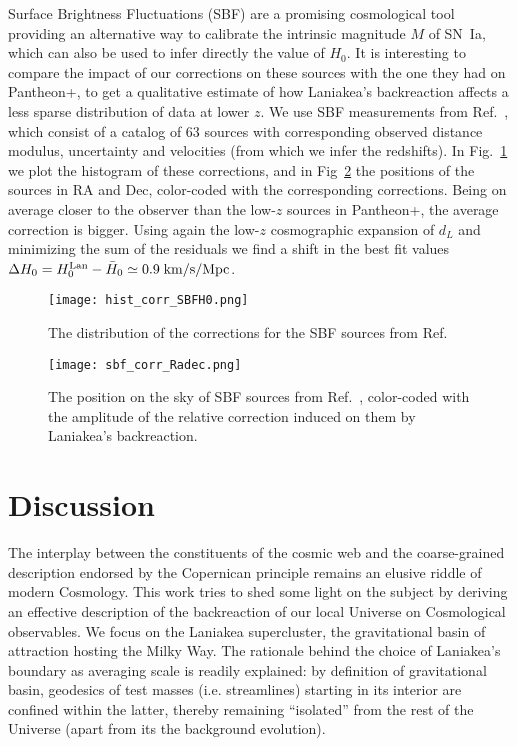 \documentclass[notitlepage,nofootinbib]{revtex4-1}
\begin{document}
Surface Brightness Fluctuations (SBF) are a promising cosmological tool providing an alternative way to calibrate the intrinsic magnitude $M$ of SN~Ia, which can also be used to infer directly the value of $H_0$. It is interesting to compare the impact of our corrections on these sources with the one they had on Pantheon+, to get a qualitative estimate of how Laniakea's backreaction affects a less sparse distribution of data at lower $z$. 
We use SBF measurements from Ref.~\cite{2021ApJS..255...21J}, which consist of a catalog of 63 sources with corresponding observed distance modulus, uncertainty and velocities (from which we infer the redshifts). In Fig.~\ref{SBFcorr-radec-hist} we plot the histogram of these corrections, and in Fig~\ref{SBFcorr-radec} the positions of the sources in RA and Dec, color-coded with the corresponding corrections. Being on average closer to the observer than the low-$z$ sources in Pantheon+, the average correction is bigger. Using again the low-$z$ cosmographic expansion of $d_L$ and minimizing the sum of the residuals we find a shift in the best fit values $\Delta H_0= H_0^{\rm{Lan}} -\bar{H}_0 \simeq 0.9 \;\rm{km}/\rm{s}/\rm{Mpc}$.

\begin{figure}[h]
  \texttt{[image: hist\_corr\_SBFH0.png]}\\
	\caption{ The distribution of the corrections for the SBF sources from Ref.~\cite{2021ApJS..255...21J}}\label{SBFcorr-radec-hist}
\end{figure}

\begin{figure}[h]

    \texttt{[image: sbf\_corr\_Radec.png]}
	\caption{The position on the sky of SBF sources from Ref.~\cite{2021ApJS..255...21J}, color-coded with the amplitude of the relative correction induced on them by Laniakea's backreaction.}\label{SBFcorr-radec}
\end{figure}



\section{Discussion}\label{conclusion}
The interplay between the constituents of the cosmic web and the coarse-grained description endorsed by the Copernican principle remains an elusive riddle of modern Cosmology. This work tries to shed some light on the subject by deriving an effective description of the backreaction of our local Universe on Cosmological observables. We focus on the Laniakea supercluster, the gravitational basin of attraction hosting the Milky Way. The rationale behind the choice of Laniakea's boundary as averaging scale is readily explained: by definition of gravitational basin, geodesics of test masses (i.e. streamlines) starting in its interior are confined within the latter,  thereby remaining ``isolated'' from the rest of the Universe (apart from its the background evolution). 
\end{document}
